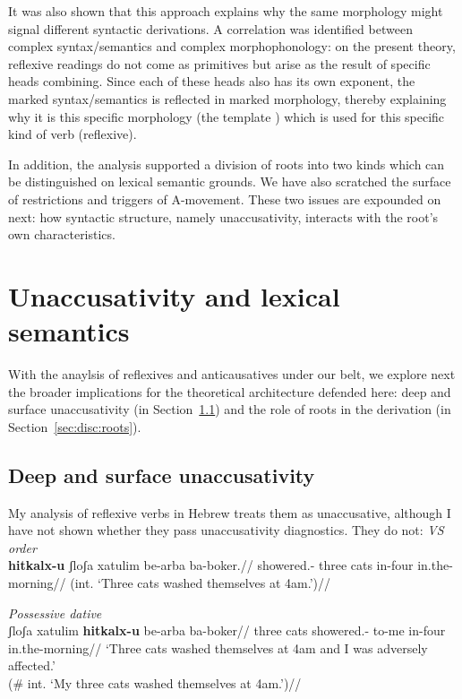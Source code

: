 It was also shown that this approach explains why the same morphology might signal different syntactic derivations. A correlation was identified between complex syntax/semantics and complex morphophonology: on the present theory, reflexive readings do not come as primitives but arise as the result of specific heads combining. Since each of these heads also has its own exponent, the marked syntax/semantics is reflected in marked morphology, thereby explaining why it is this specific morphology (the template {\thit}) which is used for this specific kind of verb (reflexive).

In addition, the analysis supported a division of roots into two kinds which can be distinguished on lexical semantic grounds. We have also scratched the surface of restrictions and triggers of A-movement. These two issues are expounded on next: how syntactic structure, namely unaccusativity, interacts with the root's own characteristics.


\section{Unaccusativity and lexical semantics} \label{sec:disc}
With the anaylsis of reflexives and anticausatives under our belt, we explore next the broader implications for the theoretical architecture defended here: deep and surface unaccusativity (in Section~\ref{sec:disc:unacc}) and the role of roots in the derivation (in Section~\ref{sec:disc:roots}).

	\subsection{Deep and surface unaccusativity} \label{sec:disc:unacc}
My analysis of reflexive verbs in Hebrew treats them as unaccusative, although I have not shown whether they pass unaccusativity diagnostics. They do not:
\ex \textit{VS order}\label{ex:refl-vs}\\
\begingl
\gla \ljudge{\#}\textbf{hitkalx-u} ʃloʃa xatulim be-arba ba-boker.//
\glb showered.- three cats in-four in.the-morning//
\glft (int. `Three cats washed themselves at 4am.')//
\endgl
\xe

\ex \textit{Possessive dative}\label{ex:refl-pd}\\
\begingl 
\gla \ljudge{\#}ʃloʃa xatulim \textbf{hitkalx-u}  be-arba ba-boker//
\glb three cats showered.- to-me in-four in.the-morning//
\glft `Three cats washed themselves at 4am and I was adversely affected.'\\
	(\# int. `My three cats washed themselves at 4am.')//
\endgl
\xe

